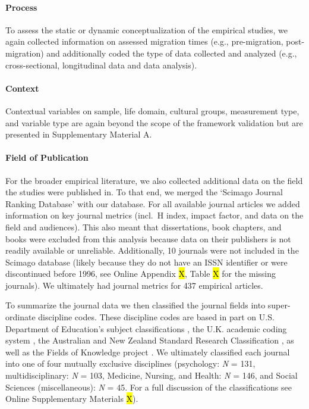 \paragraph{Process}

To assess the static or dynamic conceptualization of the empirical
studies, we again collected information on assessed migration times
(e.g., pre-migration, post-migration) and additionally coded the type of
data collected and analyzed (e.g., cross-sectional, longitudinal data
and data analysis).

\paragraph{Context}

Contextual variables on sample, life domain, cultural groups,
measurement type, and variable type are again beyond the scope of the
framework validation but are presented in Supplementary Material A.

\paragraph{Field of Publication}

For the broader empirical literature, we also collected additional data
on the field the studies were published in. To that end, we merged the
`Scimago Journal Ranking Database' \citep{SCImago2020} with our
database. For all available journal articles we added information on key
journal metrics (incl.~H index, impact factor, and data on the field and
audiences). This also meant that dissertations, book chapters, and books
were excluded from this analysis because data on their publishers is not
readily available or unreliable. Additionally, 10 journals were not
included in the Scimago database (likely because they do not have an
ISSN identifier or were discontinued before 1996, see Online Appendix
\hl{X}, Table \hl{X} for the missing journals). We ultimately had
journal metrics for 437 empirical articles.

To summarize the journal data we then classified the journal fields into
super-ordinate discipline codes. These discipline codes are based in
part on U.S. Department of Education's subject classifications
\citep[i.e., CIP;][]{InstituteofEducationSciences2020}, the U.K.
academic coding system
\citep[JACS 3.0;][]{HigherEducationStatisticsAgency2013}, the Australian
and New Zealand Standard Research Classification
\citep[ANZSRC 2020;][]{AustralianBureauofStatistics2020}, as well as the
Fields of Knowledge project \citep{ThingsmadeThinkable2014}. We
ultimately classified each journal into one of four mutually exclusive
disciplines (psychology: \textit{N} = 131, multidisciplinary: \textit{N}
= 103, Medicine, Nursing, and Health: \textit{N} = 146, and Social
Sciences (miscellaneous): \textit{N} = 45. For a full discussion of the
classifications see Online Supplementary Materials \hl{X}).

